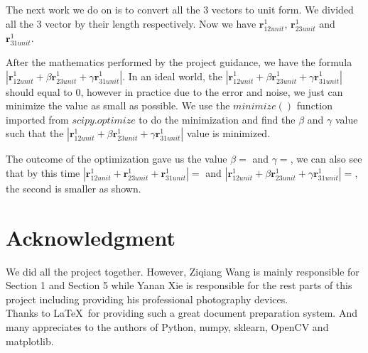 \documentclass[10pt,twocolumn,letterpaper]{article}
\begin{document}
The next work we do on is to convert all the 3 vectors to unit form. We divided all the 3 vector by their length respectively. Now we have $\textbf{r}_{12unit}^{1}$, $\textbf{r}_{23unit}^{1}$ and $\textbf{r}_{31unit}^{1}$. 

After the mathematics performed by the project guidance, we have the formula $| \textbf{r}_{12unit}^{1} + \beta  \textbf{r}_{23unit}^{1} + \gamma  \textbf{r}_{31unit}^{1} |$. In an ideal world, the $| \textbf{r}_{12unit}^{1} + \beta  \textbf{r}_{23unit}^{1} + \gamma  \textbf{r}_{31unit}^{1} |$ should equal to $0$, however in practice due to the error and noise, we just can minimize the value as small as possible. We use the $minimize()$ function imported from $scipy.optimize$ to do the minimization and find the $\beta$ and $\gamma$ value such that the $| \textbf{r}_{12unit}^{1} + \beta  \textbf{r}_{23unit}^{1} + \gamma  \textbf{r}_{31unit}^{1} |$ value is minimized.

The outcome of the optimization gave us the value  $\beta = $ and $\gamma = $, we can also see that by this time $| \textbf{r}_{12unit}^{1} +  \textbf{r}_{23unit}^{1} +  \textbf{r}_{31unit}^{1} | = $ and $| \textbf{r}_{12unit}^{1} + \beta  \textbf{r}_{23unit}^{1} + \gamma  \textbf{r}_{31unit}^{1} | = $, the second is smaller as shown.


\section{Acknowledgment}
We did all the project together. However, Ziqiang Wang is mainly responsible for
Section 1 and Section 5 while Yanan Xie is responsible for the rest parts of this project including providing his professional photography devices.\\

Thanks to \LaTeX\ for providing such a great document preparation system. And many appreciates to the authors of Python, numpy, sklearn, OpenCV and matplotlib.\\
\end{document}
